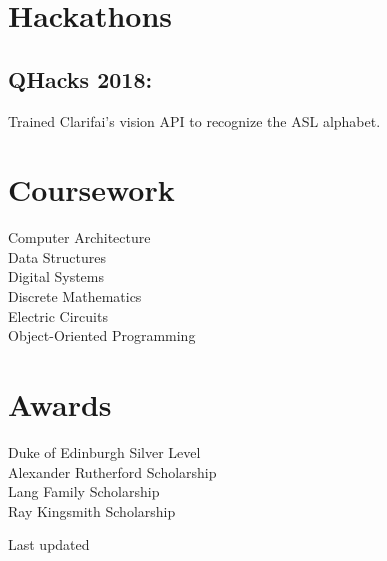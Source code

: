 \documentclass[]{hieudo-build}
\begin{document}
\begin{minipage}[t]{0.34\textwidth}
\sectionsep

\section{Hackathons}
\subsection{QHacks 2018:}
Trained Clarifai's vision API to recognize the ASL alphabet.
\sectionsep


\section{Coursework}
Computer Architecture \\
Data Structures \\
Digital Systems \\
Discrete Mathematics \\
Electric Circuits \\
Object-Oriented Programming\\
\sectionsep

\section{Awards}
Duke of Edinburgh Silver Level\\
Alexander Rutherford Scholarship \\
Lang Family Scholarship \\
Ray Kingsmith Scholarship \\
\sectionsep

\sectionsep
{}
Last updated 

%
%
\end{minipage} 
\hfill
\end{document}
